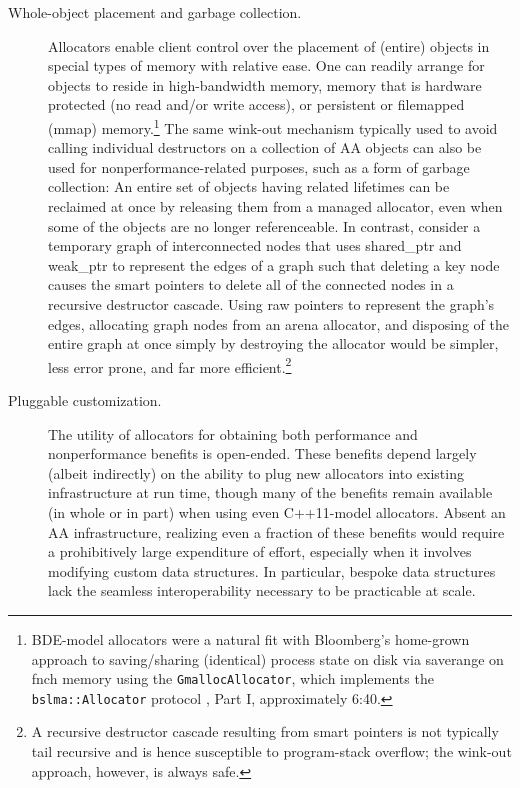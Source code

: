 \begin{description}
\item[Whole-object placement and garbage collection.] Allocators enable client control
over the placement of (entire) objects in special types of memory with relative ease.
One can readily arrange for objects to reside in high-bandwidth memory, memory
that is hardware protected (no read and/or write access), or persistent or
filemapped (mmap) memory.\footnote{BDE-model allocators were a natural fit with Bloomberg’s home-grown approach to saving/sharing
(identical) process state on disk via saverange on fnch memory using the \lstinline{GmallocAllocator}, which
implements the \lstinline{bslma::Allocator} protocol \cite{lakos17b}, Part I, approximately 6:40.}
The same wink-out mechanism typically used to avoid
calling individual destructors on a collection of AA objects can also be used
for nonperformance-related purposes, such as a form of garbage collection: An entire set of
objects having related lifetimes can be reclaimed at once by releasing them from a
managed allocator, even when some of the objects are no longer referenceable. In
contrast, consider a temporary graph of interconnected nodes that uses shared_ptr
and weak_ptr to represent the edges of a graph such that deleting a key node
causes the smart pointers to delete all of the connected nodes in a recursive
destructor cascade. Using raw pointers to represent the graph’s edges, allocating
graph nodes from an arena allocator, and disposing of the entire graph at once
simply by destroying the allocator would be simpler, less error prone, and far more
efficient.\footnote{A recursive destructor cascade resulting from smart pointers is not typically tail recursive and is
hence susceptible to program-stack overflow; the wink-out approach, however, is always safe.}

\item[Pluggable customization.] The utility of allocators for obtaining both performance
and nonperformance benefits is open-ended. These benefits depend largely (albeit
indirectly) on the ability to plug new allocators into existing infrastructure at run
time, though many of the benefits remain available (in whole or in part) when using
even C++11-model allocators. Absent an AA infrastructure, realizing even a fraction
of these benefits would require a prohibitively large expenditure of effort, especially
when it involves modifying custom data structures. In particular, bespoke data
structures lack the seamless interoperability necessary to be practicable at scale.

\end{description}

